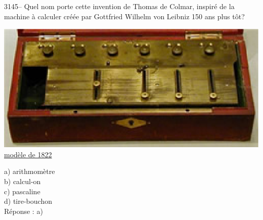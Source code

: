 \documentclass[letterpaper, 12pt]{article}
\begin{document}
3145-- Quel nom porte cette invention de Thomas de Colmar, inspir\'e de la machine \`a calculer cr\'e\'ee par Gottfried Wilhelm von Leibniz 150 ans plus t\^ot?
\begin{center}
\includegraphics[scale=0.6]{T1822.eps}\\
\href{http://www.arithmometre.org/}{mod\`ele de 1822}\\[5mm]
\end{center}

a) arithmom\`etre\\
b) calcul-on\\
c) pascaline\\
d) tire-bouchon\\

R\'eponse : a)\\
\end{document}
